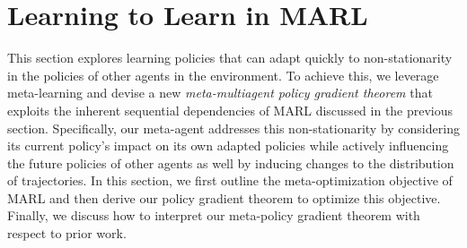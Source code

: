 \section{Learning to Learn in MARL}\label{sec:approach}   
This section explores learning policies that can adapt quickly to non-stationarity in the policies of other agents in the environment.      
To achieve this, we leverage meta-learning and devise a new \textit{meta-multiagent policy gradient theorem} that exploits the inherent sequential dependencies of MARL discussed in the previous section. 
Specifically, our meta-agent addresses this non-stationarity by considering its current policy's impact on its own adapted policies while actively influencing the future policies of other agents as well by inducing changes to the distribution of trajectories.
In this section, we first outline the meta-optimization objective of MARL and then derive our policy gradient theorem to optimize this objective. 
Finally, we discuss how to interpret our meta-policy gradient theorem with respect to prior work. %

